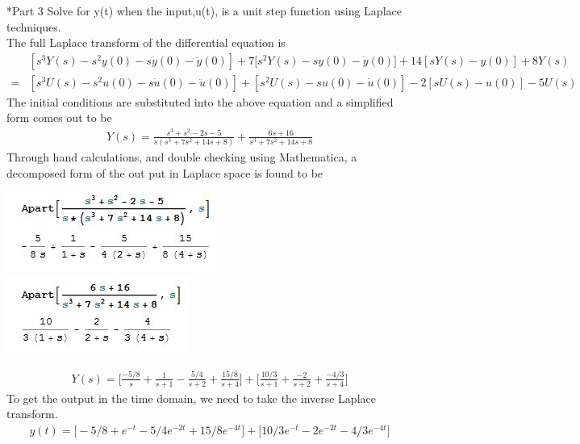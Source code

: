 \documentclass[paper=a4, fontsize=11pt]{scrartcl} %
\numberwithin{equation}{section} %
\numberwithin{figure}{section} %
\numberwithin{table}{section} %
\begin{document}
\begin{section}*{Part 3}
Solve for y(t) when the input,u(t), is a unit step function using Laplace techniques.\\
\newline
The full Laplace transform of the differential equation is
\begin{align*}
&[s^3Y(s)-s^2y(0)-s\dot{y}(0)-\ddot{y}(0)]+7\big[s^2Y(s)-sy(0)-\dot{y}(0)]+14[sY(s)-y(0)]+8Y(s)\\=&[s^3U(s)-s^2u(0)-s\dot{u}(0)-\ddot{u}(0)]+[s^2U(s)-su(0)-\dot{u}(0)]-2[sU(s)-u(0)]-5U(s)
\end{align*}
The initial conditions are substituted into the above equation and a simplified form comes out to be
\begin{align}
Y(s)=\frac{s^3+s^2-2s-5}{s(s^3+7s^2+14s+8)}+\frac{6s+16}{s^3+7s^2+14s+8}
\end{align}
Through hand calculations, and double checking using Mathematica, a decomposed form of the out put in Laplace space is found to be
\begin{center}
\includegraphics{Image8}\\
\includegraphics{Image9}\\
\end{center}
\begin{align}
Y(s)=\bigg[\frac{-5/8}{s}+\frac{1}{s+1}-\frac{5/4}{s+2}+\frac{15/8}{s+4}\bigg]+\bigg[\frac{10/3}{s+1}+\frac{-2}{s+2}+\frac{-4/3}{s+4}\bigg]
\end{align}
To get the output in the time domain, we need to take the inverse Laplace transform.
\begin{align}
y(t)=\big[-5/8+e^{-t}-5/4e^{-2t}+15/8e^{-4t}\big]+\big[10/3e^{-t}-2e^{-2t}-4/3e^{-4t}]
\end{align}
\end{section}
\end{document}
